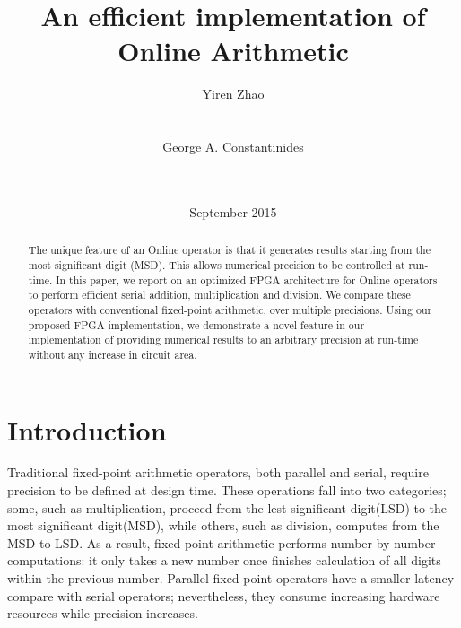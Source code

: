 \documentclass{sig-alternate}
\begin{document}
	\title{An efficient implementation of Online Arithmetic}
	
	
	\author{
		\alignauthor
		Yiren Zhao\\
		\\
		\\
		\alignauthor
		George A. Constantinides\\
		\\
		\\
	}
	\date{September 2015}
	
	\maketitle
	
	\begin{abstract}
		The unique feature of an Online operator is that it generates results starting from the most significant digit (MSD). This allows numerical precision to be controlled at run-time. In this paper, we report on an optimized FPGA architecture for Online operators to perform efficient serial addition, multiplication and division. We compare these operators with conventional fixed-point arithmetic, over multiple precisions. Using our proposed FPGA implementation, we demonstrate a novel feature in our implementation of providing numerical results to an arbitrary precision at run-time without any increase in circuit area. 
	\end{abstract}
	
	
	\section{Introduction}
    Traditional fixed-point arithmetic operators, both parallel and serial, require precision to be defined at design time. These operations fall into two categories; some, such as multiplication, proceed from the lest significant digit(LSD) to the most significant digit(MSD), while others, such as division, computes from the MSD to LSD. As a result, fixed-point arithmetic performs number-by-number computations: it only takes a new number once finishes calculation of all digits within the previous number. Parallel fixed-point operators have a smaller latency compare with serial operators; nevertheless, they consume increasing hardware resources while precision increases. 
	
\end{document}
